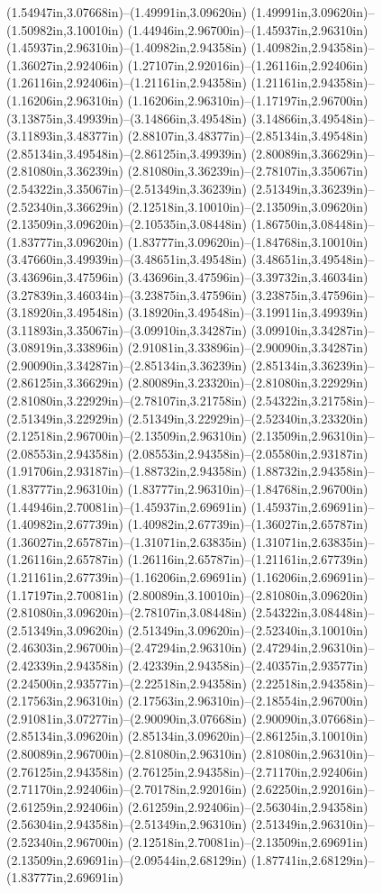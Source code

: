 (1.54947in,3.07668in)--(1.49991in,3.09620in) (1.49991in,3.09620in)--(1.50982in,3.10010in) (1.44946in,2.96700in)--(1.45937in,2.96310in) (1.45937in,2.96310in)--(1.40982in,2.94358in) (1.40982in,2.94358in)--(1.36027in,2.92406in) (1.27107in,2.92016in)--(1.26116in,2.92406in) (1.26116in,2.92406in)--(1.21161in,2.94358in) (1.21161in,2.94358in)--(1.16206in,2.96310in) (1.16206in,2.96310in)--(1.17197in,2.96700in) (3.13875in,3.49939in)--(3.14866in,3.49548in) (3.14866in,3.49548in)--(3.11893in,3.48377in) (2.88107in,3.48377in)--(2.85134in,3.49548in) (2.85134in,3.49548in)--(2.86125in,3.49939in) (2.80089in,3.36629in)--(2.81080in,3.36239in) (2.81080in,3.36239in)--(2.78107in,3.35067in) (2.54322in,3.35067in)--(2.51349in,3.36239in) (2.51349in,3.36239in)--(2.52340in,3.36629in) (2.12518in,3.10010in)--(2.13509in,3.09620in) (2.13509in,3.09620in)--(2.10535in,3.08448in) (1.86750in,3.08448in)--(1.83777in,3.09620in) (1.83777in,3.09620in)--(1.84768in,3.10010in) (3.47660in,3.49939in)--(3.48651in,3.49548in) (3.48651in,3.49548in)--(3.43696in,3.47596in) (3.43696in,3.47596in)--(3.39732in,3.46034in) (3.27839in,3.46034in)--(3.23875in,3.47596in) (3.23875in,3.47596in)--(3.18920in,3.49548in) (3.18920in,3.49548in)--(3.19911in,3.49939in) (3.11893in,3.35067in)--(3.09910in,3.34287in) (3.09910in,3.34287in)--(3.08919in,3.33896in) (2.91081in,3.33896in)--(2.90090in,3.34287in) (2.90090in,3.34287in)--(2.85134in,3.36239in) (2.85134in,3.36239in)--(2.86125in,3.36629in) (2.80089in,3.23320in)--(2.81080in,3.22929in) (2.81080in,3.22929in)--(2.78107in,3.21758in) (2.54322in,3.21758in)--(2.51349in,3.22929in) (2.51349in,3.22929in)--(2.52340in,3.23320in) (2.12518in,2.96700in)--(2.13509in,2.96310in) (2.13509in,2.96310in)--(2.08553in,2.94358in) (2.08553in,2.94358in)--(2.05580in,2.93187in) (1.91706in,2.93187in)--(1.88732in,2.94358in) (1.88732in,2.94358in)--(1.83777in,2.96310in) (1.83777in,2.96310in)--(1.84768in,2.96700in) (1.44946in,2.70081in)--(1.45937in,2.69691in) (1.45937in,2.69691in)--(1.40982in,2.67739in) (1.40982in,2.67739in)--(1.36027in,2.65787in) (1.36027in,2.65787in)--(1.31071in,2.63835in) (1.31071in,2.63835in)--(1.26116in,2.65787in) (1.26116in,2.65787in)--(1.21161in,2.67739in) (1.21161in,2.67739in)--(1.16206in,2.69691in) (1.16206in,2.69691in)--(1.17197in,2.70081in) (2.80089in,3.10010in)--(2.81080in,3.09620in) (2.81080in,3.09620in)--(2.78107in,3.08448in) (2.54322in,3.08448in)--(2.51349in,3.09620in) (2.51349in,3.09620in)--(2.52340in,3.10010in) (2.46303in,2.96700in)--(2.47294in,2.96310in) (2.47294in,2.96310in)--(2.42339in,2.94358in) (2.42339in,2.94358in)--(2.40357in,2.93577in) (2.24500in,2.93577in)--(2.22518in,2.94358in) (2.22518in,2.94358in)--(2.17563in,2.96310in) (2.17563in,2.96310in)--(2.18554in,2.96700in) (2.91081in,3.07277in)--(2.90090in,3.07668in) (2.90090in,3.07668in)--(2.85134in,3.09620in) (2.85134in,3.09620in)--(2.86125in,3.10010in) (2.80089in,2.96700in)--(2.81080in,2.96310in) (2.81080in,2.96310in)--(2.76125in,2.94358in) (2.76125in,2.94358in)--(2.71170in,2.92406in) (2.71170in,2.92406in)--(2.70178in,2.92016in) (2.62250in,2.92016in)--(2.61259in,2.92406in) (2.61259in,2.92406in)--(2.56304in,2.94358in) (2.56304in,2.94358in)--(2.51349in,2.96310in) (2.51349in,2.96310in)--(2.52340in,2.96700in) (2.12518in,2.70081in)--(2.13509in,2.69691in) (2.13509in,2.69691in)--(2.09544in,2.68129in) (1.87741in,2.68129in)--(1.83777in,2.69691in) 